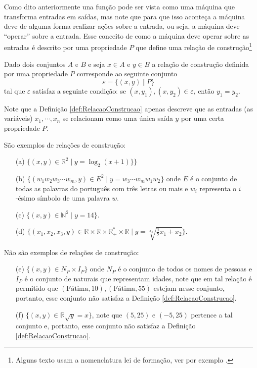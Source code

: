 Como dito anteriormente una função pode ser vista como uma máquina que transforma entradas em saídas, mas note que para que isso aconteça a máquina deve de alguma forma realizar ações sobre a entrada, ou seja, a máquina deve ``operar'' sobre a entrada. Esse conceito de como a máquina deve operar sobre as entradas é descrito por uma propriedade $P$ que define uma relação de construção\footnote{Alguns texto usam a nomenclatura lei de formação, ver por exemplo \cite{carmo2013}.}

\begin{definition}\label{def:RelacaoConstrucao}
	Dado dois conjuntos $A$ e $B$ e seja $x \in A$ e $y \in B$ a relação de construção definida por uma propriedade $P$ corresponde  ao seguinte conjunto 
	$$\varepsilon = \{(x, y)\mid P\}$$ tal que $\varepsilon$ satisfaz a seguinte condição: se $(x, y_1), (x, y_2) \in \varepsilon$, então $y_1 = y_2$.
\end{definition}

Note que a Definição \ref{def:RelacaoConstrucao} apenas descreve que as entradas (as variáveis) $x_1, \cdots, x_n$ se relacionam como uma única saída $y$ por uma certa propriedade $P$.

\begin{example}\label{exe:RelacaoConstrucao}
	São exemplos de relações de construção:
	\begin{itemize}
		\item[(a)] $\{(x, y) \in \mathbb{R}^2 \mid y = \log_2(x + 1)\}\}$
		\item[(b)] $\{(w_1w_2w_3\cdots w_m, y) \in E^2 \mid y = w_3\cdots w_mw_1w_2\}$ onde $E$ é o conjunto de todas as palavras do português com três letras ou mais e $w_i$ representa o $i$-ésimo símbolo de uma palavra $w$.
		\item[(c)] $\{(x, y) \in \mathbb{N}^2 \mid y = 14\}$.
		\item[(d)] $\Big\{(x_1, x_2, x_3, y) \in \mathbb{R} \times \mathbb{R} \times \mathbb{R}^*_+ \times \mathbb{R} \mid y = \sqrt[x_3]{\displaystyle\frac{1}{2}x_1 + x_2}\Big\}$.
	\end{itemize}
	Não são exemplos de relações de construção:
	\begin{itemize}
		\item[(e)] $\{(x, y) \in N_P \times I_P\}$ onde $N_P$ é o conjunto de todos os nomes de pessoas e $I_P$ é o conjunto de naturais que representam idades, note que em tal relação é permitido que $(\text{Fátima}, 10), (\text{Fátima}, 55)$ estejam nesse conjunto, portanto, esse conjunto não satisfaz a Definição \ref{def:RelacaoConstrucao}.
		\item[(f)] $\{(x, y) \in \mathbb{R} \sqrt{y} = x\}$, note que $(5, 25)$ e $(-5, 25)$ pertence a tal conjunto e, portanto, esse conjunto não satisfaz a Definição \ref{def:RelacaoConstrucao}.
	\end{itemize}
\end{example}

